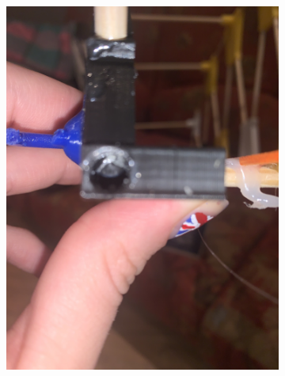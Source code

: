 \documentclass{report}
\newcommand{\subimgw}{.7\linewidth}
\begin{document}
\begin{figure}[H]
	\begin{subfigure}{.5\textwidth}
		\centering
		\includegraphics[width=\subimgw,trim={0 40cm 0 5cm},clip]{beam-6}


\end{subfigure}
\end{figure}
\end{document}
